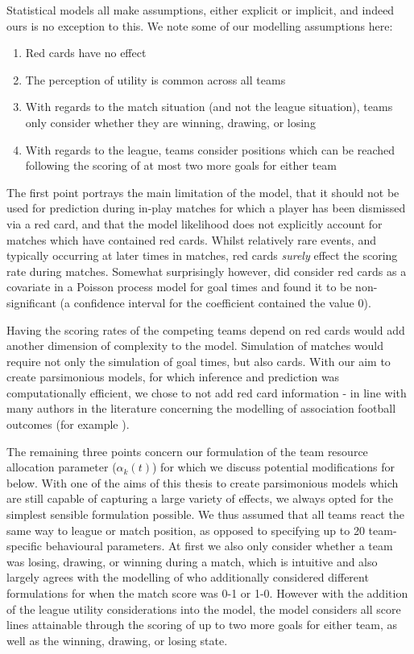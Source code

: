 Statistical models all make assumptions, either explicit or implicit, and indeed ours is no exception to this. We note
some of our modelling assumptions here:
\begin{enumerate}
  \item Red cards have no effect
  \item The perception of utility is common across all teams
  \item With regards to the match situation (and not the league situation), teams only consider whether they are
  winning, drawing, or losing
  \item With regards to the league, teams consider positions which can be reached following the scoring of at
  most two more goals for either team
\end{enumerate}

The first point portrays the main limitation of the model, that it should not be used for prediction during in-play
matches for which a player has been dismissed via a red card, and that the model likelihood does not explicitly account
for matches which have contained red cards. Whilst relatively rare events, and typically occurring at later times in
matches, red cards \textit{surely} effect the scoring rate during matches. Somewhat surprisingly however,
\cite{volf2009} did consider red cards as a covariate in a Poisson process model for goal times and found it to be
non-significant (a confidence interval for the coefficient contained the value 0).

Having the scoring rates of the competing teams depend on red cards would add another dimension of complexity to the
model. Simulation of matches would require not only the simulation of goal times, but also cards. With our aim to create
parsimonious models, for which inference and prediction was computationally efficient, we chose to not add red card
information - in line with many authors in the literature concerning the modelling of association football outcomes
(for example \cite{DixonColes1997, DixonRobinson1998, mchale2011}).

The remaining three points concern our formulation of the team resource allocation parameter (\(\alpha_k(t)\)) for which
we discuss potential modifications for below. With one of the aims of this thesis to create parsimonious models which
are still capable of capturing a large variety of effects, we always opted for the simplest sensible formulation
possible. We thus assumed that all teams react the same way to league or match position, as opposed to specifying up to
20 team-specific behavioural parameters. At first we also only consider whether a team was losing, drawing, or winning
during a match, which is intuitive and also largely agrees with the modelling of \cite{DixonRobinson1998} who
additionally considered different formulations for when the match score was 0-1 or 1-0. However with the addition of the
league utility considerations into the model, the model considers all score lines attainable through the scoring of up
to two more goals for either team, as well as the winning, drawing, or losing state.

